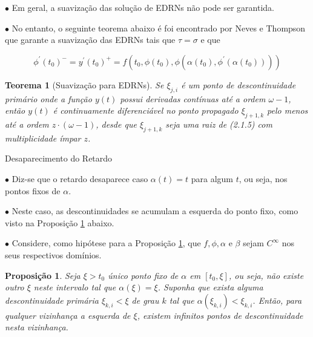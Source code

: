 \documentclass{beamer}
\theoremstyle{plain}
\newtheorem{teo}{Teorema}
\newtheorem{prop}{Proposição}
\theoremstyle{definition}
\begin{document}

\begin{frame}
    
    $\bullet$ Em geral, a suavização das solução de EDRNs não pode ser garantida. 

    $\bullet$ No entanto, o seguinte teorema abaixo é foi encontrado por Neves e Thompson \cite{neves[206]} que garante a suavização das EDRNs tais que $\tau=\sigma$ e que 

    \[
    \phi^{\prime}(t_{0})^{-}=y^{\prime}(t_{0})^{+}=f(t_{0}, \phi(t_{0}), \phi(\alpha(t_{0}), \phi^{\prime}(\alpha(t_{0}))))
    \]


    \begin{teo}[Suavização para EDRNs]
        \label{chap2:teo:2}
        Se $\xi_{j, i}$ é um ponto de descontinuidade primário onde a função $y(t)$ possui derivadas contínuas até a ordem $\omega-1$, então $y(t)$ é continuamente diferenciável no ponto propagado $\xi_{j+1, k}$ pelo menos até a ordem $z \cdot(\omega-1)$, desde que $\xi_{j+1, k}$ seja uma raiz de (2.1.5) com multiplicidade ímpar $z$.
    \end{teo} 

\end{frame}



\begin{frame}{Desaparecimento do Retardo}

    $\bullet$ Diz-se que o retardo desaparece caso $\alpha(t) = t$ para algum $t$, ou seja, nos pontos fixos de $\alpha$.

    $\bullet$ Neste caso, as descontinuidades se acumulam a esquerda do ponto fixo, como visto na Proposição \ref{chap2:prop:1} abaixo.

    $\bullet$ Considere, como hipótese para a Proposição \ref{chap2:prop:1}, que $f, \phi, \alpha$ e $\beta$ sejam $C^\infty$ nos seus respectivos domínios.


    \begin{prop}
        \label{chap2:prop:1}
        Seja $\xi > t_0$ único ponto fixo de $\alpha$ em $[t_0, \xi]$, ou seja, não existe outro $\xi$ neste intervalo tal que $\alpha(\xi) = \xi$. Suponha que exista alguma descontinuidade primária $\xi_{k, i} < \xi$ de grau $k$ tal que $\alpha(\xi_{k, i}) < \xi_{k, i}$. Então, para qualquer vizinhança a esquerda de $\xi$, existem infinitos pontos de descontinuidade nesta vizinhança.

    \end{prop}

\end{frame}
\end{document}
